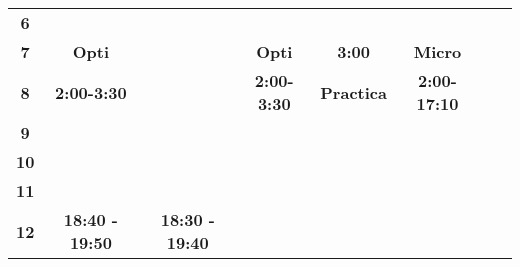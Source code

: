 \begin{table}[htbp]
\begin{tabular}{cccccccc}
		\rowcolor[rgb]{ 1,  .851,  .4} \textbf{6} & \cellcolor[rgb]{ .718,  .718,  .718} & \cellcolor[rgb]{ .718,  .718,  .718} & \cellcolor[rgb]{ .718,  .718,  .718} & \cellcolor[rgb]{ .718,  .718,  .718} & \cellcolor[rgb]{ .718,  .718,  .718} & \cellcolor[rgb]{ .718,  .718,  .718} & \cellcolor[rgb]{ .718,  .718,  .718} \\
		\rowcolor[rgb]{ 1,  .851,  .4} \textbf{7} & \multicolumn{1}{p{7.645em}}{\cellcolor[rgb]{ 1,  .6,  0}\textbf{Opti}} & \cellcolor[rgb]{ .718,  .718,  .718} & \multicolumn{1}{p{5.355em}}{\cellcolor[rgb]{ 1,  .6,  0}\textbf{Opti}} & \cellcolor[rgb]{ .714,  .843,  .659}\textbf{3:00} & \multicolumn{1}{p{5.355em}}{\cellcolor[rgb]{ 1,  .6,  0}\textbf{Micro}} & \cellcolor[rgb]{ .718,  .718,  .718} & \cellcolor[rgb]{ .718,  .718,  .718} \\
		\rowcolor[rgb]{ 1,  .851,  .4} \textbf{8} & \multicolumn{1}{p{7.645em}}{\cellcolor[rgb]{ 1,  .6,  0}\textbf{2:00-3:30}} & \cellcolor[rgb]{ .718,  .718,  .718} & \multicolumn{1}{p{5.355em}}{\cellcolor[rgb]{ 1,  .6,  0}\textbf{2:00-3:30}} & \multicolumn{1}{p{5.355em}}{\cellcolor[rgb]{ .714,  .843,  .659}\textbf{Practica}} & \multicolumn{1}{p{5.355em}}{\cellcolor[rgb]{ 1,  .6,  0}\textbf{2:00-17:10}} & \cellcolor[rgb]{ .718,  .718,  .718} & \cellcolor[rgb]{ .718,  .718,  .718} \\
		\rowcolor[rgb]{ 1,  .851,  .4} \textbf{9} & \cellcolor[rgb]{ .718,  .718,  .718} & \cellcolor[rgb]{ .718,  .718,  .718} & \cellcolor[rgb]{ .718,  .718,  .718} & \cellcolor[rgb]{ .718,  .718,  .718} & \cellcolor[rgb]{ 1,  .6,  0} & \cellcolor[rgb]{ .718,  .718,  .718} & \cellcolor[rgb]{ .718,  .718,  .718} \\
		\rowcolor[rgb]{ 1,  .851,  .4} \textbf{10} & \cellcolor[rgb]{ .718,  .718,  .718} & \cellcolor[rgb]{ .718,  .718,  .718} & \cellcolor[rgb]{ .718,  .718,  .718} & \cellcolor[rgb]{ .718,  .718,  .718} & \cellcolor[rgb]{ 1,  .6,  0} & \cellcolor[rgb]{ .718,  .718,  .718} & \cellcolor[rgb]{ .718,  .718,  .718} \\
		\rowcolor[rgb]{ 1,  .851,  .4} \textbf{11} & \cellcolor[rgb]{ .718,  .718,  .718} & \cellcolor[rgb]{ .718,  .718,  .718} & \cellcolor[rgb]{ .718,  .718,  .718} & \cellcolor[rgb]{ .718,  .718,  .718} & \cellcolor[rgb]{ .718,  .718,  .718} & \cellcolor[rgb]{ .718,  .718,  .718} & \cellcolor[rgb]{ .718,  .718,  .718} \\
		\rowcolor[rgb]{ 1,  .851,  .4} \textbf{12} & \multicolumn{1}{p{7.645em}}{\cellcolor[rgb]{ .918,  .6,  .6}\textbf{18:40 - 19:50}} & \multicolumn{1}{p{7.285em}}{\cellcolor[rgb]{ .918,  .6,  .6}\textbf{18:30 - 19:40}} & \cellcolor[rgb]{ .718,  .718,  .718} & \cellcolor[rgb]{ .718,  .718,  .718} & \cellcolor[rgb]{ .718,  .718,  .718} & \cellcolor[rgb]{ .718,  .718,  .718} & \cellcolor[rgb]{ .718,  .718,  .718} \\

\end{tabular}
\end{table}
